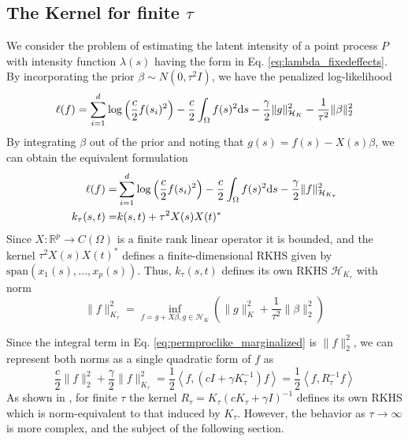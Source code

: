 \documentclass[ejsv2,preprint]{imsart}
\newcommand{\diffd}{\textnormal{d}}
\newcommand{\inprod}[2]{\left\langle #1,#2\right\rangle}
\newcommand{\SPAN}[1]{\text{span}\left(#1\right)}
\begin{document}
\subsection{The Kernel for finite $\tau$} 
We consider the problem of estimating the latent intensity of a point process $P$ with intensity function $\lambda(s)$ having the form in Eq. \eqref{eq:lambda_fixedeffects}. By incorporating the prior $\beta\sim N(0,\tau^2I)$, we have the penalized log-likelihood
\begin{equation}\label{eq:k_kernel_tau}
    \ell(f)=\sum_{i=1}^d\log\left(\frac{c}{2}f(s_i)^2\right) - \frac{c}{2}\int_{\Omega}f(s)^2 \diffd s-\frac{\gamma}{2}\|g\|_{\mathcal{H}_K}^2-\frac{1}{\tau^2}\|\beta\|_2^2
\end{equation}
By integrating $\beta$ out of the prior and noting that $g(s)=f(s)-X(s)\beta$, we can obtain the equivalent formulation
\begin{equation}
    \label{eq:permproclike_marginalized}
    \begin{split}
    \ell(f) = &\sum_{i=1}^d\log\left(\frac{c}{2}f(s_i)^2\right) - \frac{c}{2}\int_{\Omega}f(s)^2 \diffd s-\frac{\gamma}{2}\|f\|_{\mathcal{H}_{K_\tau}}^2 \\
k_\tau(s,t) = & k(s,t)+\tau^2 X(s)X(t)^*
    \end{split}
\end{equation}
Since $X:\mathbb{R}^p\to C(\Omega)$ is a finite rank linear operator it is bounded, and the kernel $\tau^2 X(s)X(t)^*$ defines a finite-dimensional RKHS given by $\SPAN{ x_1(s),...,x_p(s) }$. Thus, $k_{\tau}(s,t)$ defines its own RKHS $\mathcal{H}_{K_\tau}$ with norm \cite{rkhs_book}
\begin{equation}\label{eq:Ktau_norm}
\|f\|_{K_\tau}^2 =\underset{f=g+X\beta,g\in \mathcal{H}_K}{\inf}\left(  \|g\|_{K}^2+\frac{1}{\tau^2}\|\beta\|_2^2\right)
\end{equation}

Since the integral term in Eq. \eqref{eq:permproclike_marginalized} is $\|f\|_2^2$, we can represent both norms as a single quadratic form of $f$ as 
\begin{equation}
    \frac{c}{2}\|f\|_2^2+\frac{\gamma}{2}\|f\|_{K_\tau}^2=\frac{1}{2}\inprod{f}{\left(cI+\gamma K_\tau^{-1}\right) f}=\frac{1}{2}\inprod{f}{R_\tau^{-1} f}
\end{equation}
As shown in \cite{pmlr-v54-flaxman17a}, for finite $\tau$ the kernel $R_{\tau}= K_\tau\left(cK_\tau+\gamma I\right)^{-1}$ defines its own RKHS which is norm-equivalent to that induced by $K_\tau$. However, the behavior as $\tau\to \infty$ is more complex, and the subject of the following section.
\end{document}

